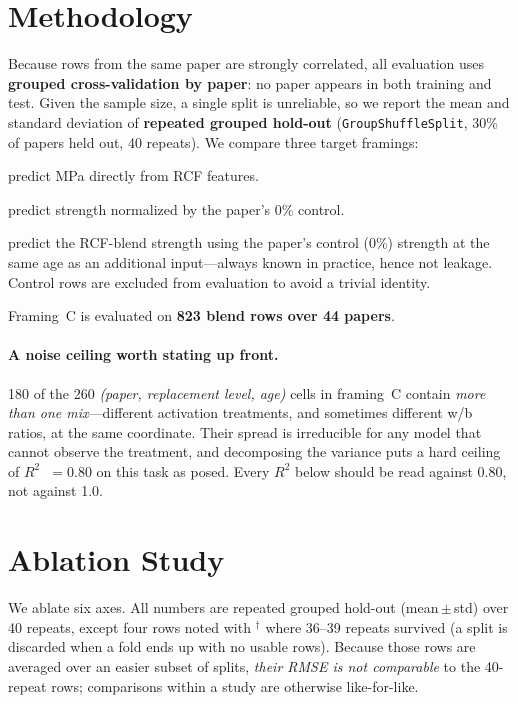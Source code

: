 \documentclass[11pt]{article}
\newcommand{\R}{$R^2$}
\begin{document}
\section{Methodology}
Because rows from the same paper are strongly correlated, all evaluation uses
\textbf{grouped cross-validation by paper}: no paper appears in both training and
test. Given the sample size, a single split is unreliable, so we report the mean and
standard deviation of \textbf{repeated grouped hold-out}
(\texttt{GroupShuffleSplit}, 30\% of papers held out, 40 repeats). We compare three
target framings:
\begin{description}\itemsep2pt
  \item[A. Absolute strength, all papers] predict MPa directly from RCF features.
  \item[B. Relative-to-control] predict strength normalized by the paper's 0\%
        control.
  \item[C. Absolute strength given control] predict the RCF-blend strength using
        the paper's control (0\%) strength at the same age as an additional
        input---always known in practice, hence not leakage. Control rows are
        excluded from evaluation to avoid a trivial identity.
\end{description}
Framing~C is evaluated on \textbf{823 blend rows over 44 papers}.

\paragraph{A noise ceiling worth stating up front.}
\label{sec:ceiling}
180 of the 260 \emph{(paper, replacement level, age)} cells in framing~C contain
\emph{more than one mix}---different activation treatments, and sometimes different
w/b ratios, at the same coordinate. Their spread is irreducible for any model that
cannot observe the treatment, and decomposing the variance puts a hard ceiling of
\textbf{\R{}~$=0.80$} on this task as posed. Every \R{} below should be read against
0.80, not against 1.0.

\section{Ablation Study}
\label{sec:abl}
We ablate six axes. All numbers are repeated grouped hold-out (mean\,$\pm$\,std)
over 40 repeats, except four rows noted with $^{\dagger}$ where 36--39 repeats
survived (a split is discarded when a fold ends up with no usable rows). Because
those rows are averaged over an easier subset of splits, \emph{their RMSE is not
comparable} to the 40-repeat rows; comparisons within a study are otherwise
like-for-like.
\end{document}
